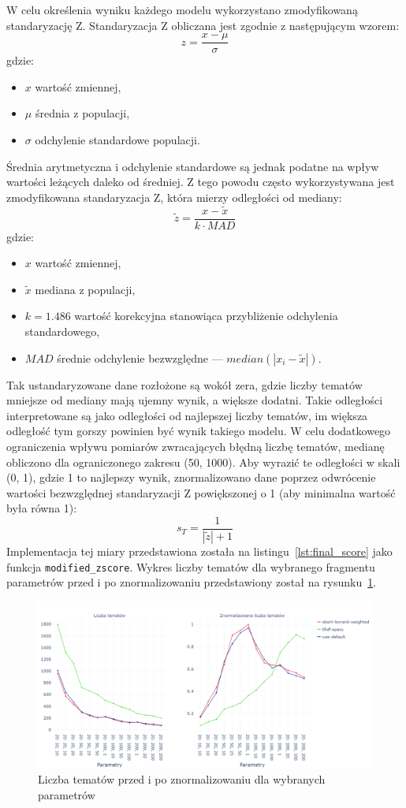 		W celu określenia wyniku każdego modelu wykorzystano zmodyfikowaną standaryzację Z.
		Standaryzacja Z obliczana jest zgodnie z następującym wzorem:
		\[z=\frac{x-\mu}{\sigma}\]
		gdzie:
		\begin{itemize}
			\item \(x\) wartość zmiennej,
			\item \(\mu\) średnia z populacji,
			\item \(\sigma\) odchylenie standardowe populacji.
		\end{itemize}
		
		Średnia arytmetyczna i odchylenie standardowe są jednak podatne na wpływ wartości leżących daleko od średniej.
		Z tego powodu często wykorzystywana jest zmodyfikowana standaryzacja Z, która mierzy odległości od mediany:
		\[\tilde{z}=\frac{x-\tilde{x}}{k\cdot MAD}\]
		gdzie:
		\begin{itemize}
			\item \(x\) wartość zmiennej,
			\item \(\tilde{x}\) mediana z populacji,
			\item \(k=1.486\) wartość korekcyjna stanowiąca przybliżenie odchylenia standardowego,
			\item \(MAD\) średnie odchylenie bezwzględne --- \(median\left(|x_i-\tilde{x}|\right)\).
		\end{itemize}

		Tak ustandaryzowane dane rozłożone są wokół zera, gdzie liczby tematów mniejsze od mediany mają ujemny wynik, a większe dodatni.
		Takie odległości interpretowane są jako odległości od najlepszej liczby tematów,
			im większa odległość tym gorszy powinien być wynik takiego modelu.
		W celu dodatkowego ograniczenia wpływu pomiarów zwracających błędną liczbę tematów, medianę obliczono dla ograniczonego zakresu (50, 1000).
		Aby wyrazić te odległości w skali (0, 1), gdzie 1 to najlepszy wynik, znormalizowano dane
			poprzez odwrócenie wartości bezwzględnej standaryzacji Z powiększonej o 1 (aby minimalna wartość była równa 1):
		\[s_T=\frac{1}{|\tilde{z}|+1}\]
		Implementacja tej miary przedstawiona została na listingu~\ref{lst:final_score} jako funkcja \verb|modified_zscore|.
		Wykres liczby tematów dla wybranego fragmentu parametrów przed i po znormalizowaniu przedstawiony został na rysunku~\ref{fig:topic_counts}.

		\begin{figure}[htb]
			\centering
			\includegraphics[width=\linewidth]{rys05/topic_counts.png}
			\caption{Liczba tematów przed i po znormalizowaniu dla wybranych parametrów}\label{fig:topic_counts}
		\end{figure}

